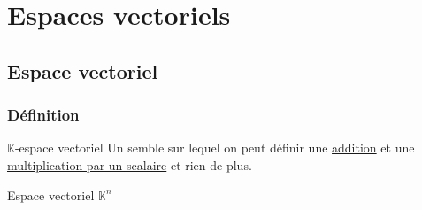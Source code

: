 \chapter{Espaces vectoriels} %
\label{chap:Espaces vectoriels}

\section{Espace vectoriel} %
\label{sec:Espace vectoriel}

\subsection{Définition} %
\label{sub:Définition}

\begin{Definition}[colbacktitle=red!75!black]{$\mathbb{K}$-espace vectoriel}{}
Un semble sur lequel on peut définir une \underline{addition} et une \underline{multiplication par un scalaire} et rien de plus.
\end{Definition}

\begin{Prop}{Espace vectoriel $\mathbb{K}^{n}$}{}

\end{Prop}



